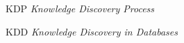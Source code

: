 
\begin{siglas}
	\item[KDP] \textit{Knowledge Discovery Process}
    	\item[KDD] \textit{Knowledge Discovery in Databases}
\end{siglas}


